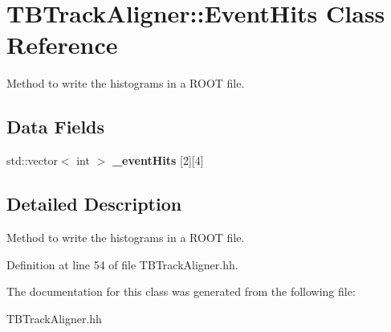 \section{T\-B\-Track\-Aligner\-:\-:Event\-Hits Class Reference}
\label{classTBTrackAligner_1_1EventHits}


Method to write the histograms in a R\-O\-O\-T file.  


\subsection*{Data Fields}
\begin{DoxyCompactItemize}
\item 
std\-::vector$<$ int $>$ {\bfseries \-\_\-event\-Hits} [2][4]\label{classTBTrackAligner_1_1EventHits_afb7cf3fe9d066546baa05ea1980bf4a6}

\end{DoxyCompactItemize}


\subsection{Detailed Description}
Method to write the histograms in a R\-O\-O\-T file. 

Definition at line 54 of file T\-B\-Track\-Aligner.\-hh.



The documentation for this class was generated from the following file\-:\begin{DoxyCompactItemize}
\item 
T\-B\-Track\-Aligner.\-hh\end{DoxyCompactItemize}
